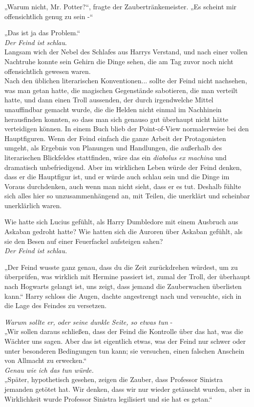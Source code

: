 {„Warum nicht, Mr. Potter?“, fragte der Zaubertränkemeister. „Es scheint mir offensichtlich genug zu sein -“

„Das ist ja das Problem.“\\ \emph{Der Feind ist schlau}.\\ Langsam wich der Nebel des Schlafes aus Harrys Verstand, und nach einer vollen Nachtruhe konnte sein Gehirn die Dinge sehen, die am Tag zuvor noch nicht offensichtlich gewesen waren.\\ Nach den üblichen literarischen Konventionen... sollte der Feind nicht nachsehen, was man getan hatte, die magischen Gegenstände sabotieren, die man verteilt hatte, und dann einen Troll aussenden, der durch irgendwelche Mittel unauffindbar gemacht wurde, die die Helden nicht einmal im Nachhinein herausfinden konnten, so dass man sich genauso gut überhaupt nicht hätte verteidigen können. In einem Buch blieb der Point-of-View normalerweise bei den Hauptfiguren. Wenn der Feind einfach die ganze Arbeit der Protagonisten umgeht, als Ergebnis von Planungen und Handlungen, die außerhalb des literarischen Blickfeldes stattfinden, wäre das ein \emph{diabolus ex machina} und dramatisch unbefriedigend. Aber im wirklichen Leben würde der Feind denken, dass er die Hauptfigur ist, und er würde auch schlau sein und die Dinge im Voraus durchdenken, auch wenn man nicht sieht, dass er es tut. Deshalb fühlte sich alles hier so unzusammenhängend an, mit Teilen, die unerklärt und scheinbar unerklärlich waren.

Wie hatte sich Lucius gefühlt, als Harry Dumbledore mit einem Ausbruch aus Askaban gedroht hatte? Wie hatten sich die Auroren über Askaban gefühlt, als sie den Besen auf einer Feuerfackel aufsteigen sahen?\\ \emph{Der Feind ist schlau.}

„Der Feind wusste ganz genau, dass du die Zeit zurückdrehen würdest, um zu überprüfen, was wirklich mit Hermine passiert ist, zumal der Troll, der überhaupt nach Hogwarts gelangt ist, uns zeigt, dass jemand die Zauberwachen überlisten kann.“ Harry schloss die Augen, dachte angestrengt nach und versuchte, sich in die Lage des Feindes zu versetzen.

\emph{Warum sollte er, oder seine dunkle Seite, so etwas tun} -\\ „Wir sollen daraus schließen, dass der Feind die Kontrolle über das hat, was die Wächter uns sagen. Aber das ist eigentlich etwas, was der Feind nur schwer oder unter besonderen Bedingungen tun kann; sie versuchen, einen falschen Anschein von Allmacht zu erwecken.“\\ \emph{Genau wie ich das tun würde.}\\ „Später, hypothetisch gesehen, zeigen die Zauber, dass Professor Sinistra jemanden getötet hat. Wir denken, dass wir nur wieder getäuscht wurden, aber in Wirklichkeit wurde Professor Sinistra legilisiert und sie hat es getan.“

}
